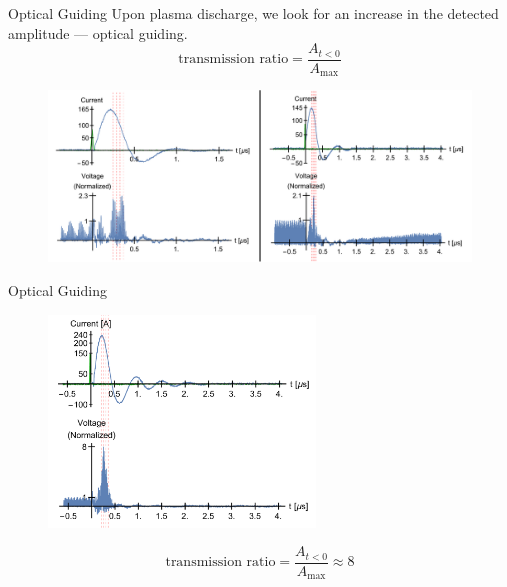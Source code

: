 \documentclass[dvipsnames]{beamer}
\begin{document}
  \begin{frame}{Optical Guiding}
    Upon plasma discharge, we look for an increase in the detected amplitude --- optical guiding.
    \begin{equation*}
      \text{transmission ratio} = \frac{A_{t<0}}{A_\text{max}}
    \end{equation*}
    \begin{figure}
      \includegraphics[width=\textwidth]{figures/results/oscillator/guiding1.pdf}
    \end{figure}
  \end{frame}
  \begin{frame}{Optical Guiding}
    \begin{figure}
      \includegraphics[height=160pt]{figures/results/oscillator/guiding2.pdf}
    \end{figure}
    \begin{equation*}
      \text{transmission ratio} = \frac{A_{t<0}}{A_\text{max}} \approx 8
    \end{equation*}
  \end{frame}
\end{document}
